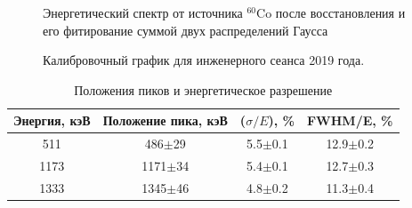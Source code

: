 \begin{figure}[H]
  \caption{Энергетический спектр от источника $^{60}$Co после восстановления и его фитирование суммой двух распределений Гаусса}
  \label{img:spectrCo}  
\end{figure}

\begin{figure}[H]
  \caption{Калибровочный график для инженерного сеанса 2019 года.}
  \label{img:calibplot2019}  
\end{figure}

\begin{table}[hbt]
    \centering
        \caption{Положения пиков и энергетическое разрешение}
\begin{tabular}{|c|c|c|c|}
\hline
    Энергия, кэВ & Положение пика, кэВ & ($\sigma/E$), \% & FWHM/E,  \%\\
    \hline
    511 & 486$\pm$29 & 5.5$\pm$0.1 & 12.9$\pm$0.2\\
    \hline
    1173 & 1171$\pm$34 & 5.4$\pm$0.1 & 12.7$\pm$0.3\\
    \hline
    1333 & 1345$\pm$46 & 4.8$\pm$0.2 & 11.3$\pm$0.4\\
    \hline
\end{tabular}
    \label{tab:resolution2019}
\end{table}

